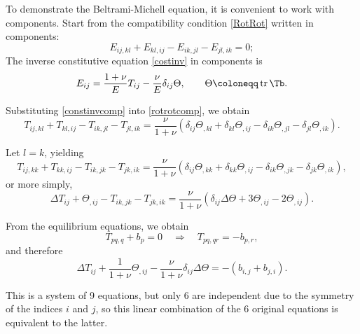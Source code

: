To demonstrate the Beltrami-Michell equation, it is convenient to work with components. 
Start from the compatibility condition \eqref{RotRot} written in components:
\begin{equation}\label{rotrotcomp}
	E_{ij,kl} + E_{kl,ij} - E_{ik,jl} - E_{jl,ik} = 0;
\end{equation}
The inverse constitutive equation \eqref{costinv} in components is
\begin{equation}\label{constinvcomp}
	E_{ij} = \frac{1+\nu}{E} T_{ij} - \frac{\nu}{E} \delta_{ij} \Theta, \qquad 	\Theta \coloneqq \operatorname{tr} \Tb.
\end{equation}

Substituting \eqref{constinvcomp} into \eqref{rotrotcomp}, we obtain
\begin{equation}\label{rotrotcompT}
	T_{ij,kl} + T_{kl,ij} - T_{ik,jl} - T_{jl,ik} = \frac{\nu}{1+\nu} \left( \delta_{ij} \Theta_{,kl} + \delta_{kl} \Theta_{,ij} - \delta_{ik} \Theta_{,jl} - \delta_{jl} \Theta_{,ik} \right).
\end{equation}

Let $l = k$, yielding
\begin{equation}
	T_{ij,kk} + T_{kk,ij} - T_{ik,jk} - T_{jk,ik} = \frac{\nu}{1+\nu} \left( \delta_{ij} \Theta_{,kk} + \delta_{kk} \Theta_{,ij} - \delta_{ik} \Theta_{,jk} - \delta_{jk} \Theta_{,ik} \right),
\end{equation}
or more simply,
\begin{equation}
	\Delta T_{ij} + \Theta_{,ij} - T_{ik,jk} - T_{jk,ik} = \frac{\nu}{1+\nu} \left( \delta_{ij} \Delta \Theta + 3 \Theta_{,ij} - 2 \Theta_{,ij} \right).
\end{equation}

From the equilibrium equations, we obtain
\begin{equation}
	T_{pq,q} + b_p = 0 \quad \Rightarrow \quad T_{pq,qr} = -b_{p,r},
\end{equation}
and therefore
\begin{equation}
	\Delta T_{ij} + \frac{1}{1+\nu} \Theta_{,ij} - \frac{\nu}{1+\nu} \delta_{ij} \Delta \Theta = -(b_{i,j} + b_{j,i}).
\end{equation}

This is a system of 9 equations, but only 6 are independent due to the symmetry of the indices $i$ and $j$, so this linear combination of the 6 original equations is equivalent to the latter.

